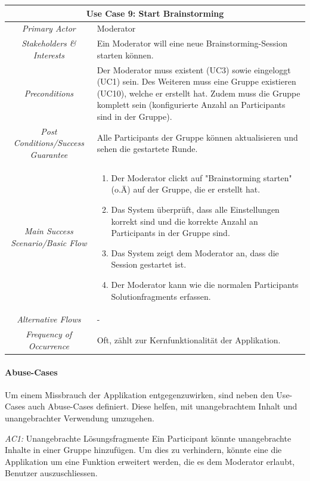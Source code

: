 \renewcommand{\arraystretch}{1.35}
\begin{center}
	\begin{longtable}{| c | p{7cm} |}
		\hline
		\multicolumn{2}{|c|}{\textbf{Use Case 9: Start Brainstorming}}\\
		\hline\hline
		\textit{Primary Actor} & Moderator\\
		\hline
		\textit{Stakeholders \& Interests} & Ein Moderator will eine neue Brainstorming-Session starten können. \\
		\hline
		\textit{Preconditions} & Der Moderator muss existent (UC3) sowie eingeloggt (UC1) sein. Des Weiteren muss eine Gruppe existieren (UC10), welche er erstellt hat. Zudem muss die Gruppe komplett sein (konfigurierte Anzahl an Participants sind in der Gruppe). \\
		\hline
		\textit{Post Conditions/Success Guarantee} & Alle Participants der Gruppe können aktualisieren und sehen die gestartete Runde. \\
		\hline
		\textit{Main Success Scenario/Basic Flow} & 
		\begin{enumerate}[noitemsep]
			\item Der Moderator clickt auf "Brainstorming starten" (o.Ä) auf der Gruppe, die er erstellt hat. 
			\item Das System überprüft, dass alle Einstellungen korrekt sind und die korrekte Anzahl an Participants in der Gruppe sind. 
			\item Das System zeigt dem Moderator an, dass die Session gestartet ist.
			\item Der Moderator kann wie die normalen Participants Solutionfragments erfassen.
		\end{enumerate}\\
		\hline
		\textit{Alternative Flows} & -\\
		
		\hline
		
		\textit{Frequency of Occurrence} & Oft, zählt zur Kernfunktionalität der Applikation.\\
		
		\hline
	\end{longtable}
\end{center}




\paragraph{Abuse-Cases}
Um einem Missbrauch der Applikation entgegenzuwirken, sind neben den Use-Cases auch Abuse-Cases definiert. Diese helfen, mit unangebrachtem Inhalt und unangebrachter Verwendung umzugehen.
\begin{basedescript}{%
		\desclabelstyle{\multilinelabel}
		\desclabelwidth{4.5cm}}
	\item[\textit{AC1: }Unangebrachte Lösungsfragmente] Ein Participant könnte unangebrachte Inhalte in einer Gruppe hinzufügen. Um dies zu verhindern, könnte eine die Applikation um eine Funktion erweitert werden, die es dem Moderator erlaubt, Benutzer auszuschliessen.
\end{basedescript}

